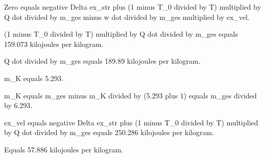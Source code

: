 Zero equals negative Delta ex_str plus (1 minus T_0 divided by T) multiplied by Q dot divided by m_ges minus w dot divided by m_ges multiplied by ex_vel.  

(1 minus T_0 divided by T) multiplied by Q dot divided by m_ges equals 159.073 kilojoules per kilogram.  

Q dot divided by m_ges equals 189.89 kilojoules per kilogram.  

m_K equals 5.293.  

m_K equals m_ges minus m_K divided by (5.293 plus 1) equals m_ges divided by 6.293.  

ex_vel equals negative Delta ex_str plus (1 minus T_0 divided by T) multiplied by Q dot divided by m_ges equals 250.286 kilojoules per kilogram.  

Equals 57.886 kilojoules per kilogram.